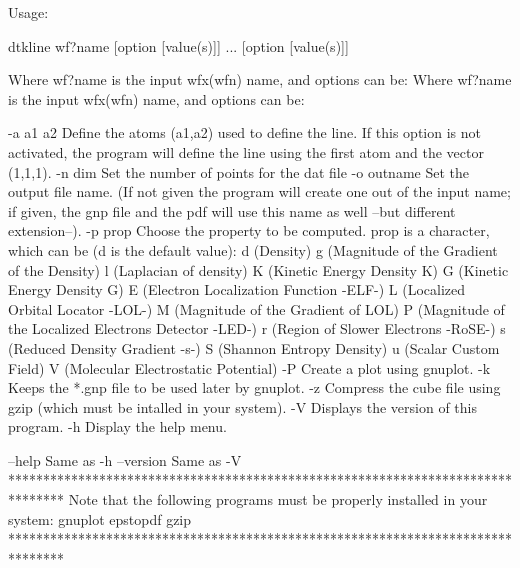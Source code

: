 Usage:

	dtkline wf?name [option [value(s)]] ... [option [value(s)]]

Where wf?name is the input wfx(wfn) name, and options can be:
Where wf?name is the input wfx(wfn) name, and options can be:

  -a a1 a2  	Define the atoms  (a1,a2) used to define the line.
            	  If this option is not activated, the program will 
            	  define the line using the first atom and the vector
            	  (1,1,1).
  -n  dim   	Set the number of points for the dat file
  -o outname	Set the output file name.
            	  (If not given the program will create one out of
            	  the input name; if given, the gnp file and the pdf will
            	  use this name as well --but different extension--).
  -p prop	Choose the property to be computed. prop is a character,
         	  which can be (d is the default value): 
         		d (Density)
         		g (Magnitude of the Gradient of the Density)
         		l (Laplacian of density)
         		K (Kinetic Energy Density K)
         		G (Kinetic Energy Density G)
         		E (Electron Localization Function -ELF-)
         		L (Localized Orbital Locator -LOL-)
         		M (Magnitude of the Gradient of LOL)
         		P (Magnitude of the Localized Electrons Detector -LED-)
         		r (Region of Slower Electrons -RoSE-)
         		s (Reduced Density Gradient -s-)
         		S (Shannon Entropy Density)
         		u (Scalar Custom Field)
         		V (Molecular Electrostatic Potential)
  -P     	Create a plot using gnuplot.
  -k     	Keeps the *.gnp file to be used later by gnuplot.
  -z     	Compress the cube file using gzip (which must be intalled
         	   in your system).
  -V        	Displays the version of this program.
  -h     	Display the help menu.

  --help    		Same as -h
  --version 		Same as -V
********************************************************************************
  Note that the following programs must be properly installed in your system:
                                    gnuplot
                                    epstopdf
                                      gzip
********************************************************************************

